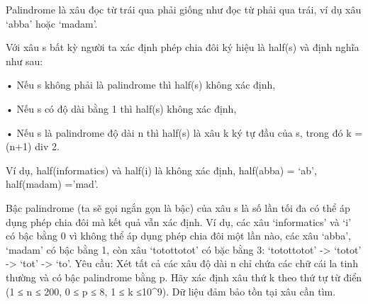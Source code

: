 Palindrome là xâu đọc từ trái qua phải giống như đọc từ phải qua trái, ví dụ xâu ‘abba’ hoặc ‘madam’.  

   Với xâu s bất kỳ người ta xác định phép chia đôi ký hiệu là half(s) và định nghĩa như sau:   


   • Nếu s không phải là palindrome thì half(s) không xác định,   


   • Nếu s có độ dài bằng 1 thì half(s) không xác định,   


   • Nếu s là palindrome độ dài n thì half(s) là xâu k ký tự đầu của s, trong đó k = (n+1) div 2.  

   Ví dụ, half(informatics) và half(i) là không xác định, half(abba) = ‘ab’, half(madam) =’mad’.  

   Bậc palindrome (ta sẽ gọi ngắn gọn là bậc) của xâu s là số lần tối đa có thể áp dụng phép chia đôi mà kết quả vẫn xác định. Ví dụ, các xâu ‘informatics’ và ‘i’ có bậc bằng 0 vì không thể áp dụng phép chia đôi một lần nào, các xâu ‘abba’, ‘madam’ có bậc bằng 1, còn xâu ‘totottotot’ có bặc bằng 3: ‘totottotot’ -> ‘totot’ -> ‘tot’ -> ‘to’.       Yêu cầu:      Xét tất cả các xâu độ dài n chỉ chứa các chữ cái la tinh thường và có bậc palindrome bằng p. Hãy xác định xâu thứ k theo thứ tự từ điển (1 ≤ n ≤ 200, 0 ≤ p ≤ 8, 1 ≤ k ≤10^9). Dữ liệu đảm bảo tồn tại xâu cần tìm.